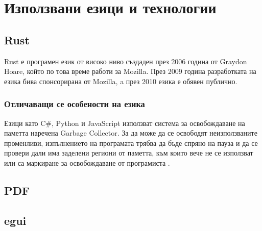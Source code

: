\section{Използвани езици и технологии}

\subsection{Rust}
Rust е програмен език от високо ниво създаден през 2006 година от Graydon
Hoare, който по това време работи за Mozilla. През 2009 година разработката на
езика бива спонсорирана от Mozilla, a през 2010 езика е обявен публично.
\cite{Rust_Origins_Wikipedia}

\subsubsection{Отличаващи се особености на езика}

Езици като C\#, Python и JavaScript използват система за освобождаване на паметта
наречена Garbage Collector. За да може да се освободят неизползваните
променливи, изпълнението на програмата трябва да бъде спряно на пауза и да се
провери дали има заделени региони от паметта, към които вече не се използват
или са маркиране за освобождаване от програмиста \cite{Garbage_Collection_Wikipedia}.


\subsection{PDF}
\subsection{egui}
